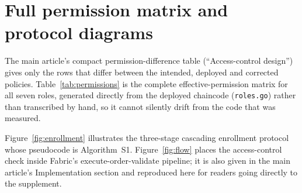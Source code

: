 \clearpage
\section{Full permission matrix and protocol diagrams}
\label{sec:supp_permissions}

The main article's compact permission-difference table (``Access-control
design'') gives only the rows that differ between the intended, deployed
and corrected policies. Table~\ref{tab:permissions} is the complete
effective-permission matrix for all seven roles, generated directly from
the deployed chaincode (\texttt{roles.go}) rather than transcribed by
hand, so it cannot silently drift from the code that was measured.



Figure~\ref{fig:enrollment} illustrates the three-stage cascading
enrollment protocol whose pseudocode is Algorithm~S1. Figure~\ref{fig:flow}
places the access-control check inside Fabric's execute-order-validate
pipeline; it is also given in the main article's Implementation section and
reproduced here for readers going directly to the supplement.

